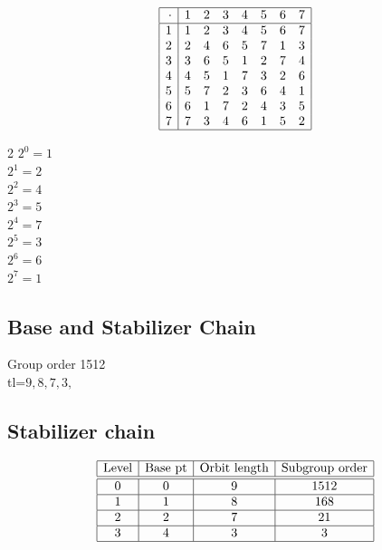 $$
\begin{array}{|r|*{7}{r}|}
\hline
\cdot  &         1 &         2 &         3 &         4 &         5 &         6 &         7\\
\hline
         1&         1&         2&         3&         4&         5&         6&         7\\
         2&         2&         4&         6&         5&         7&         1&         3\\
         3&         3&         6&         5&         1&         2&         7&         4\\
         4&         4&         5&         1&         7&         3&         2&         6\\
         5&         5&         7&         2&         3&         6&         4&         1\\
         6&         6&         1&         7&         2&         4&         3&         5\\
         7&         7&         3&         4&         6&         1&         5&         2\\
\hline
\end{array}
$$
\begin{multicols}{2}
\noindent
$2^{0} = 1$\\
$2^{1} = 2$\\
$2^{2} = 4$\\
$2^{3} = 5$\\
$2^{4} = 7$\\
$2^{5} = 3$\\
$2^{6} = 6$\\
$2^{7} = 1$\\
\end{multicols}

\bigskip

\subsection*{Base and Stabilizer Chain}
Group order 1512\\
tl=$9, 8, 7, 3, $\\

\subsection*{Stabilizer chain}


$$
\begin{array}{|c|c|c|c|}
\hline
\mbox{Level} & \mbox{Base pt} & \mbox{Orbit length} & \mbox{Subgroup order}\\
\hline
\hline
0 & 0 & 9 & 1512\\
\hline
1 & 1 & 8 & 168\\
\hline
2 & 2 & 7 & 21\\
\hline
3 & 4 & 3 & 3\\
\hline
\end{array}
$$

